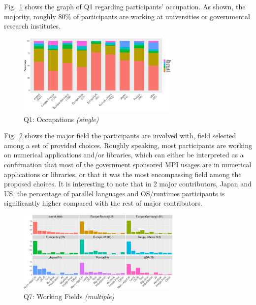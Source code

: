 \documentclass[preprint,5p,times]{elsarticle}
\def\myquote#1{{\it #1}}
\def\mcountries{major contributors\xspace{}}%
\begin{document}
Fig.~\ref{fig:occupations} shows the graph of Q1 regarding participants'
occupation. As shown, the majority, roughly 80\% of participants are working at
universities or governmental research institutes.
%
\begin{figure}[htb]
  \begin{center}
    \includegraphics[width=8.0cm]{R-scripts/Q1.pdf}
    \vspace{-2mm}
    \caption{Q1: Occupations {\it(single)}}
    \label{fig:occupations}
  \end{center}
\end{figure}

Fig.~\ref{fig:working-fields} shows the major field the participants are
involved with, field selected among a set of provided choices.
Roughly speaking, most participants are working on numerical applications and/or
libraries, which can either be interpreted as a confirmation that most of the
government sponsored MPI usages are in numerical applications or libraries, or
that it was the most encompassing field among the proposed choices.
%
It is interesting to note that in 2 \mcountries, Japan and US, the percentage of
parallel languages and OS/runtimes participants is significantly higher compared
with the rest of \mcountries.

\begin{figure}[htb]
  \begin{center}
    \includegraphics[width=8.0cm]{R-scripts/Q7.pdf}
    \vspace{-2mm}
    \caption{Q7: Working Fields {\it(multiple)}}
    \label{fig:working-fields}
  \end{center}
\end{figure}
\end{document}
